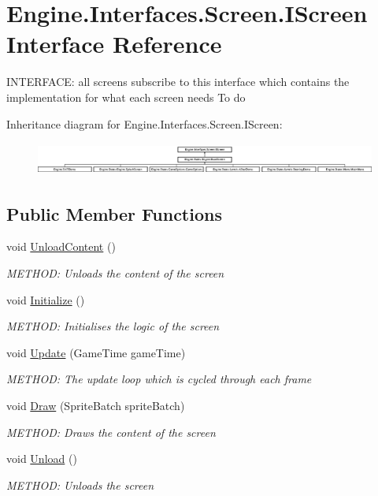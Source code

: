 \hypertarget{a00466}{}\section{Engine.\+Interfaces.\+Screen.\+I\+Screen Interface Reference}
\label{a00466}


I\+N\+T\+E\+R\+F\+A\+CE\+: all screens subscribe to this interface which contains the implementation for what each screen needs To do  


Inheritance diagram for Engine.\+Interfaces.\+Screen.\+I\+Screen\+:\begin{figure}[H]
\begin{center}
\leavevmode
\includegraphics[height=1.098039cm]{db/d2c/a00466}
\end{center}
\end{figure}
\subsection*{Public Member Functions}
\begin{DoxyCompactItemize}
\item 
void \hyperlink{a00466_aeba867b4e4bd2f0a918b837d93a4e45a}{Unload\+Content} ()
\begin{DoxyCompactList}\small\item\em M\+E\+T\+H\+OD\+: Unloads the content of the screen \end{DoxyCompactList}\item 
void \hyperlink{a00466_ad251ad712685a0f329ad2b29bde78981}{Initialize} ()
\begin{DoxyCompactList}\small\item\em M\+E\+T\+H\+OD\+: Initialises the logic of the screen \end{DoxyCompactList}\item 
void \hyperlink{a00466_a5f59b9b12c1bf29b1db612ed52d1cfd6}{Update} (Game\+Time game\+Time)
\begin{DoxyCompactList}\small\item\em M\+E\+T\+H\+OD\+: The update loop which is cycled through each frame \end{DoxyCompactList}\item 
void \hyperlink{a00466_a0c61f739fb252fcc90b91b1358511d05}{Draw} (Sprite\+Batch sprite\+Batch)
\begin{DoxyCompactList}\small\item\em M\+E\+T\+H\+OD\+: Draws the content of the screen \end{DoxyCompactList}\item 
void \hyperlink{a00466_a67f1b5deb3604a417d7452fc8873de37}{Unload} ()
\begin{DoxyCompactList}\small\item\em M\+E\+T\+H\+OD\+: Unloads the screen \end{DoxyCompactList}\end{DoxyCompactItemize}


